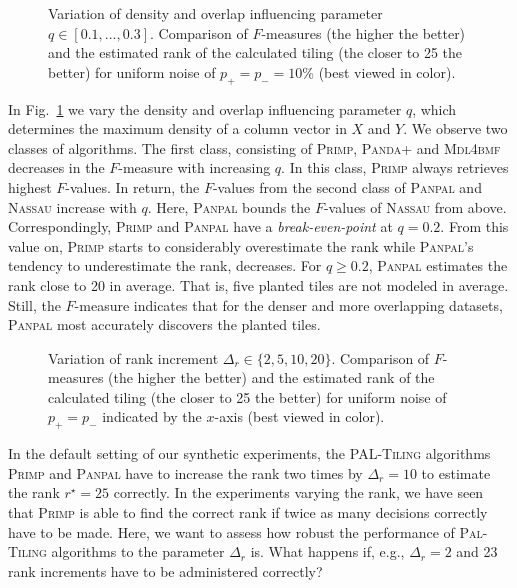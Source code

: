 \begin{figure}
\centering

\caption{Variation of density and overlap influencing parameter $q\in[0.1,\ldots,0.3]$. Comparison of $F$-measures (the higher the better) and the estimated rank of the calculated tiling (the closer to 25 the better) for uniform noise of $p_+=p_-=10\%$ (best viewed in color).}
\label{fig:density}
\end{figure}
In Fig.~\ref{fig:density} we vary the density and overlap influencing parameter $q$, which determines the maximum density of a column vector in $X$ and  $Y$.  We observe two classes of algorithms. The first class, consisting of \textsc{Primp}, \textsc{Panda+} and \textsc{Mdl4bmf} decreases in the $F$-measure with increasing $q$. In this class, \textsc{Primp} always retrieves highest $F$-values. In return, the $F$-values from the second class of \textsc{Panpal} and \textsc{Nassau} increase with $q$. Here, \textsc{Panpal} bounds the $F$-values of \textsc{Nassau} from above. Correspondingly, \textsc{Primp} and \textsc{Panpal} have a \textit{break-even-point} at $q=0.2$. From this value on, \textsc{Primp} starts to considerably overestimate the rank while \textsc{Panpal}'s tendency to underestimate the rank, decreases. For $q\geq0.2$, \textsc{Panpal} estimates the rank close to 20 in average. That is, five planted tiles are not modeled in average. Still, the $F$-measure indicates that for the denser and more overlapping datasets, \textsc{Panpal} most accurately discovers the planted tiles. 
\begin{figure}
\centering

\caption{Variation of rank increment $\Delta_r\in\{2,5,10,20\}$. Comparison of $F$-measures (the higher the better) and the estimated rank of the calculated tiling (the closer to 25 the better) for uniform noise of $p_+=p_-$ indicated by the $x$-axis (best viewed in color).}
\label{fig:rInc}
\end{figure}
In the default setting of our synthetic experiments, the \textsc{PAL-Tiling} algorithms \textsc{Primp} and \textsc{Panpal} have to increase the rank two times by $\Delta_r=10$ to estimate the rank $r^\star=25$ correctly. In the experiments varying the rank, we have seen that \textsc{Primp} is able to find the correct rank if twice as many decisions correctly have to be made.  Here, we want to assess how robust the performance of \textsc{Pal-Tiling} algorithms to the parameter $\Delta_r$ is. What happens if, e.g., $\Delta_r=2$ and 23 rank increments have to be administered correctly?


